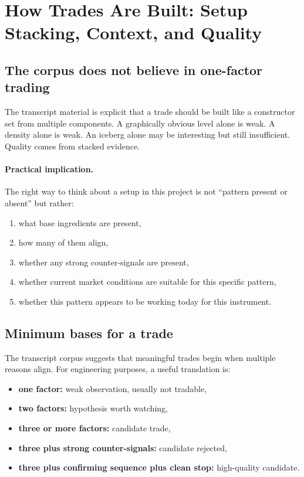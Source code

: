 \section{How Trades Are Built: Setup Stacking, Context, and Quality}

\subsection{The corpus does not believe in one-factor trading}

The transcript material is explicit that a trade should be built like a constructor set from multiple components. A graphically obvious level alone is weak. A density alone is weak. An iceberg alone may be interesting but still insufficient. Quality comes from stacked evidence.

\paragraph{Practical implication.} The right way to think about a setup in this project is not ``pattern present or absent'' but rather:

\begin{enumerate}
\item what base ingredients are present,
\item how many of them align,
\item whether any strong counter-signals are present,
\item whether current market conditions are suitable for this specific pattern,
\item whether this pattern appears to be working today for this instrument.
\end{enumerate}

\subsection{Minimum bases for a trade}

The transcript corpus suggests that meaningful trades begin when multiple reasons align. For engineering purposes, a useful translation is:

\begin{itemize}
\item \textbf{one factor:} weak observation, usually not tradable,
\item \textbf{two factors:} hypothesis worth watching,
\item \textbf{three or more factors:} candidate trade,
\item \textbf{three plus strong counter-signals:} candidate rejected,
\item \textbf{three plus confirming sequence plus clean stop:} high-quality candidate.
\end{itemize}

